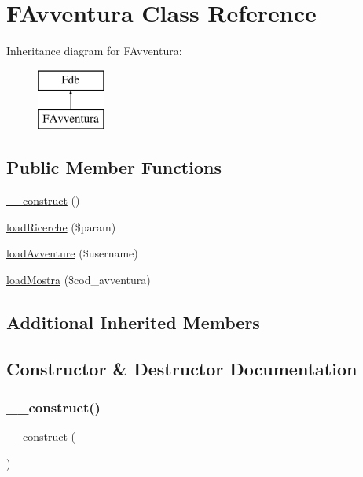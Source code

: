 \hypertarget{class_f_avventura}{}\section{F\+Avventura Class Reference}
\label{class_f_avventura}
Inheritance diagram for F\+Avventura\+:\begin{figure}[H]
\begin{center}
\leavevmode
\includegraphics[height=2.000000cm]{class_f_avventura}
\end{center}
\end{figure}
\subsection*{Public Member Functions}
\begin{DoxyCompactItemize}
\item 
\mbox{\hyperlink{class_f_avventura_a095c5d389db211932136b53f25f39685}{\+\_\+\+\_\+construct}} ()
\item 
\mbox{\hyperlink{class_f_avventura_ac2694a7dd3ef55896292c94037bad8b7}{load\+Ricerche}} (\$param)
\item 
\mbox{\hyperlink{class_f_avventura_af0d1851adb6a197e257708a29576d5a1}{load\+Avventure}} (\$username)
\item 
\mbox{\hyperlink{class_f_avventura_ac86f7880e6e8e228f0559680fbd165b1}{load\+Mostra}} (\$cod\+\_\+avventura)
\end{DoxyCompactItemize}
\subsection*{Additional Inherited Members}


\subsection{Constructor \& Destructor Documentation}
\mbox{\label{class_f_avventura_a095c5d389db211932136b53f25f39685}} 
\subsubsection{\texorpdfstring{\+\_\+\+\_\+construct()}{\_\_construct()}}
{\footnotesize\ttfamily \+\_\+\+\_\+construct (\begin{DoxyParamCaption}{ }\end{DoxyParamCaption})}


